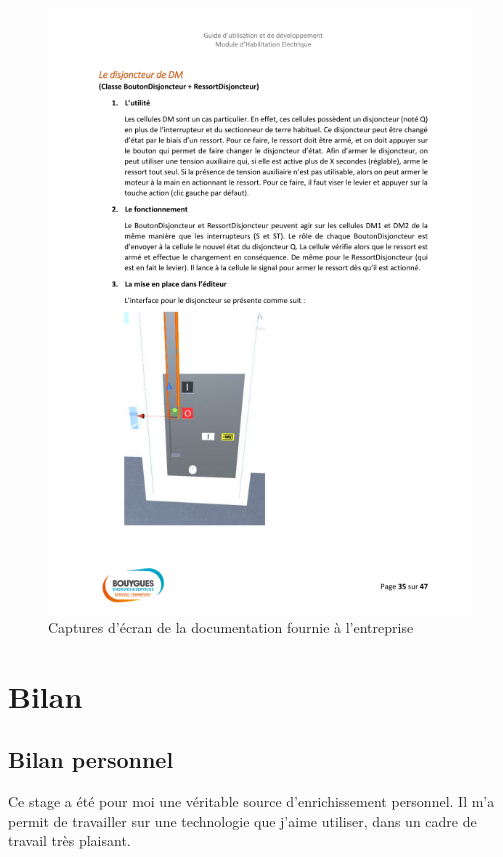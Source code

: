 \documentclass[a4paper]{article}
\begin{document}
\begin{figure}[H]
        \includegraphics[scale=0.35]{img/DocTechnique2}
        \caption{Captures d'écran de la documentation fournie à l'entreprise}
    \end{figure}

    \section{Bilan}

    \vspace{10pt}
    
    \subsection{Bilan personnel}

        Ce stage a été pour moi une véritable source d'enrichissement personnel. Il m'a permit de travailler sur une technologie que j'aime utiliser, dans un cadre de travail très plaisant. \\
\end{document}
